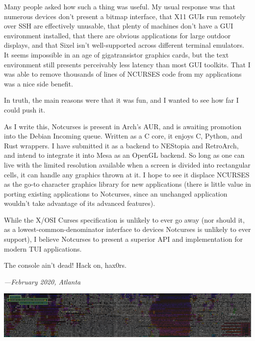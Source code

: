 \documentclass[letterpaper,10pt]{article}
\newcommand\CC{C\nolinebreak\hspace{-.05em}\raisebox{.4ex}{\relsize{-3}{\textbf{+}}}\nolinebreak\hspace{-.10em}\raisebox{.4ex}{\relsize{-3}{\textbf{+}}}\hspace{.2em}}
\begin{document}
Many people asked how such a thing was useful. My usual response was that
numerous devices don't present a bitmap interface, that X11 GUIs run remotely
over SSH are effectively unusable, that plenty of machines don't have a GUI
environment installed, that there are obvious applications for large outdoor
displays, and that Sixel isn't well-supported across different
terminal emulators. It seems impossible in an age of gigatransistor graphics
cards, but the text environment still presents perceivably less latency
than most GUI toolkits. That I was able to remove thousands of lines
of NCURSES code from my applications was a nice side benefit.

In truth, the main reasons were that it was fun, and I wanted to see how far
I could push it.

As I write this, Notcurses is present in Arch's AUR, and is awaiting promotion
into the Debian Incoming queue. Written as a C core, it enjoys \CC, Python, and
Rust wrappers. I have submitted it as a backend to NEStopia and RetroArch, and
intend to integrate it into Mesa as an OpenGL backend. So long as one can live
with the limited resolution available when a screen is divided into rectangular
cells, it can handle any graphics thrown at it. I hope to see it displace
NCURSES as the go-to character graphics library for new applications (there is
little value in porting existing applications to Notcurses, since an unchanged
application wouldn't take advantage of its advanced features).

While the X/OSI Curses specification is unlikely to ever go away (nor should
it, as a lowest-common-denominator interface to devices Notcurses is unlikely
to ever support), I believe Notcurses to present a superior API and
implementation for modern TUI applications.

The console ain't dead! Hack on, hax0rs.

\vspace{.5in}

\begin{flushright}
  \textit{---February 2020, Atlanta}
\end{flushright}

\vspace{1in}

\begin{center}
\includegraphics[width=1\linewidth]{media/widechars.png}
\end{center}
\end{document}
